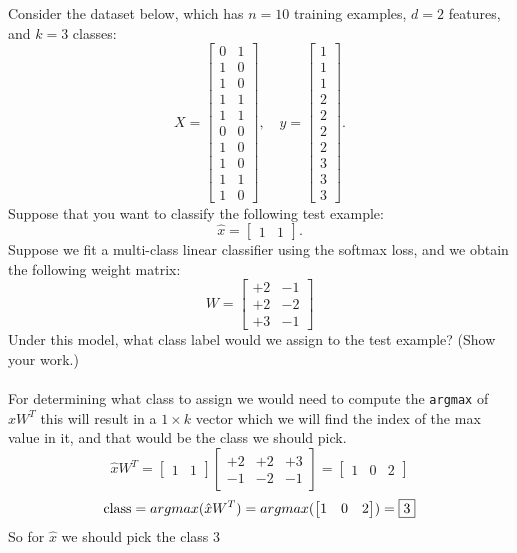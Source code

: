 \documentclass{article}
\def\blu#1{{\color{blu}#1}}
\def\ans#1{{\color{ans}#1}}
\begin{document}
Consider the dataset below, which has $n=10$ training examples, $d=2$ features, and $k=3$ classes:
\[
X = \begin{bmatrix}0 & 1\\1 & 0\\ 1 & 0\\ 1 & 1\\ 1 & 1\\ 0 & 0\\  1 & 0\\  1 & 0\\  1 & 1\\  1 &0\end{bmatrix}, \quad y = \begin{bmatrix}1\\1\\1\\2\\2\\2\\2\\3\\3\\3\end{bmatrix}.
\]
Suppose that you want to classify the following test example:
\[
\hat{x} = \begin{bmatrix}1 & 1\end{bmatrix}.
\]
Suppose we fit a multi-class linear classifier using the softmax loss, and we obtain the following weight matrix:
\[
W =
\begin{bmatrix}
+2 & -1\\
+2 & -2\\
+3 & -1
\end{bmatrix}
\]
\blu{Under this model, what class label would we assign to the test example? (Show your work.)} \\ \\
\ans{
    For determining what class to assign we would need to compute the \texttt{argmax} of $\hat{x}W^T$
    this will result in a $ 1 \times k $ vector which we will find the index of the max value in it, and 
    that would be the class we should pick.
    \[
    \hat{x}W^T = 
    \begin{bmatrix}1 & 1\end{bmatrix}
    \begin{bmatrix}
        +2 & +2 & +3\\
        -1 & -2 & -1
    \end{bmatrix}
    = \begin{bmatrix}1 & 0 & 2\end{bmatrix}
    \]
    \[ \text{class} = argmax(\hat{x}W^T) = argmax(\begin{bmatrix}1 & 0 & 2\end{bmatrix}) = \fbox{3}\]
    So for $\hat{x}$ we should pick the class 3
}
\end{document}
